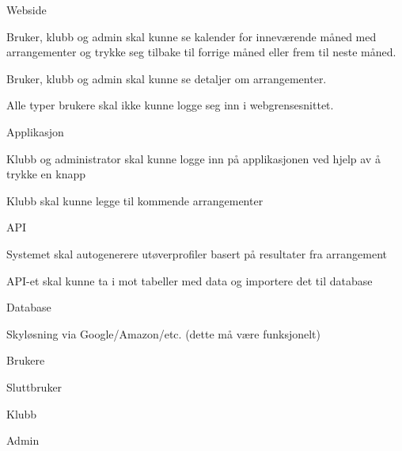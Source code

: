 \documentclass{article}
\begin{document}
\begin{legal}
    \item Webside
    \begin{legal}
        \item Bruker, klubb og admin skal kunne se kalender for inneværende måned med arrangementer og trykke seg tilbake til forrige måned eller frem til neste måned.
        \item Bruker, klubb og admin skal kunne se detaljer om arrangementer.
        \item Alle typer brukere skal ikke kunne logge seg inn i webgrensesnittet.
      
    \end{legal}
    \item Applikasjon
    \begin{legal}
        \item Klubb og administrator skal kunne logge inn på  applikasjonen ved hjelp av å trykke en knapp
        \item Klubb skal kunne legge til kommende arrangementer
        \item 
    \end{legal}
    \item API
    \begin{legal}
        \item Systemet skal autogenerere utøverprofiler basert på resultater fra arrangement
        \item API-et skal kunne ta i mot tabeller med data og importere det til database
    \end{legal}
    \item Database
    \begin{legal}
        \item Skyløsning via Google/Amazon/etc. (dette må være funksjonelt)
    \end{legal}
    \item Brukere
    \begin{legal}
        \item Sluttbruker
        \item Klubb
        \item Admin
    \end{legal}
\end{legal}
\end{document}
